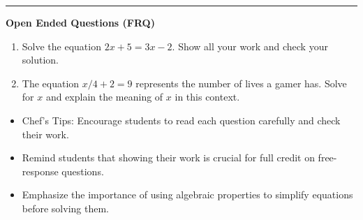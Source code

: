 \documentclass[10pt]{article}
\begin{document}
\vspace{-0.2cm}
\hrule
\vspace{0.2cm}
\textbf{\small Open Ended Questions (FRQ)}
\begin{enumerate}[label=\textbf{Q\arabic*.}, start=9, itemsep=5pt, topsep=0pt]

  \item \small Solve the equation $2x + 5 = 3x - 2$. Show all your work and check your solution. \vspace{2cm}

  \item \small The equation $x/4 + 2 = 9$ represents the number of lives a gamer has. Solve for $x$ and explain the meaning of $x$ in this context. \vspace{2cm}

\end{enumerate}

\vfill

\begin{tcolorbox}[colback=blue!5, colframe=mainblue!50, title=\small \textbf{Chef's Tips}, fonttitle=\bfseries, bottom=1mm]
\begin{itemize}[noitemsep, topsep=2pt, leftmargin=0.5cm]
  \item \scriptsize Chef's Tips: Encourage students to read each question carefully and check their work.\item \scriptsize Remind students that showing their work is crucial for full credit on free-response questions.\item \scriptsize Emphasize the importance of using algebraic properties to simplify equations before solving them.
\end{itemize}
\end{tcolorbox}
\end{document}

